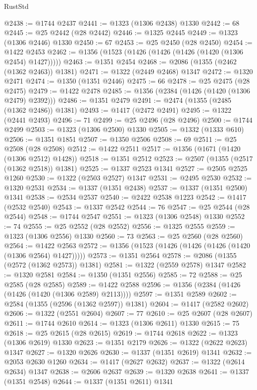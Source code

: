 \begin{lexlean}{RustStd}
\begin{coremodule}
{\begin{coremodule}
{{{{{{{{{{{{{{{{{{{{{{{{{{{{{{{{{{@2438 := @1744 @2437
@2441 := @1323 (@1306 @2438) @1330
@2442 := 68
@2445 := @25 @2442 (@28 @2442)
@2446 := @1325 @2445
@2449 := @1323 (@1306 @2446) @1330
@2450 := 67
@2453 := @25 @2450 (@28 @2450)
@2454 := @1422 @2453
@2462 := @1356 (@1523 (@1426 (@1426 (@1426 (@1420 (@1306 @2454) @1427)))))
@2463 := @1351 @2454
@2468 := @2086 (@1355 (@2462 (@1362 @2463)) @1381)
@2471 := @1322 (@2449 @2468) @1347
@2472 := @1320 @2471
@2474 := @1350 (@1351 @2446)
@2475 := 66
@2478 := @25 @2475 (@28 @2475)
@2479 := @1422 @2478
@2485 := @1356 (@2384 (@1426 (@1420 (@1306 @2479) @2392)))
@2486 := @1351 @2479
@2491 := @2474 (@1355 (@2485 (@1362 @2486)) @1381)
@2493 := @1417 (@2472 @2491)
@2495 := @1322 (@2441 @2493)
@2496 := 71
@2499 := @25 @2496 (@28 @2496)
@2500 := @1744 @2499
@2503 := @1323 (@1306 @2500) @1330
@2505 := @1332 (@1333 @610)
@2506 := @1351 @1851
@2507 := @1350 @2506
@2508 := 69
@2511 := @25 @2508 (@28 @2508)
@2512 := @1422 @2511
@2517 := @1356 (@1671 (@1420 (@1306 @2512) @1428))
@2518 := @1351 @2512
@2523 := @2507 (@1355 (@2517 (@1362 @2518)) @1381)
@2525 := @1337 @2523 @1341
@2527 := @2505 @2525 @1260
@2530 := @1322 (@2503 @2527) @1347
@2531 := @2495 @2530
@2532 := @1320 @2531
@2534 := @1337 (@1351 @2438)
@2537 := @1337 (@1351 @2500) @1341
@2538 := @2534 @2537
@2540 := @2422 @2538 @1223
@2542 := @1417 (@2532 @2540)
@2543 := @1337 @2542
@2544 := 76
@2547 := @25 @2544 (@28 @2544)
@2548 := @1744 @2547
@2551 := @1323 (@1306 @2548) @1330
@2552 := 74
@2555 := @25 @2552 (@28 @2552)
@2556 := @1325 @2555
@2559 := @1323 (@1306 @2556) @1330
@2560 := 73
@2563 := @25 @2560 (@28 @2560)
@2564 := @1422 @2563
@2572 := @1356 (@1523 (@1426 (@1426 (@1426 (@1420 (@1306 @2564) @1427)))))
@2573 := @1351 @2564
@2578 := @2086 (@1355 (@2572 (@1362 @2573)) @1381)
@2581 := @1322 (@2559 @2578) @1347
@2582 := @1320 @2581
@2584 := @1350 (@1351 @2556)
@2585 := 72
@2588 := @25 @2585 (@28 @2585)
@2589 := @1422 @2588
@2596 := @1356 (@2384 (@1426 (@1426 (@1420 (@1306 @2589) @2113))))
@2597 := @1351 @2589
@2602 := @2584 (@1355 (@2596 (@1362 @2597)) @1381)
@2604 := @1417 (@2582 @2602)
@2606 := @1322 (@2551 @2604)
@2607 := 77
@2610 := @25 @2607 (@28 @2607)
@2611 := @1744 @2610
@2614 := @1323 (@1306 @2611) @1330
@2615 := 75
@2618 := @25 @2615 (@28 @2615)
@2619 := @1744 @2618
@2622 := @1323 (@1306 @2619) @1330
@2623 := @1351 @2179
@2626 := @1322 (@2622 @2623) @1347
@2627 := @1320 @2626
@2630 := @1337 (@1351 @2619) @1341
@2632 := @2053 @2630 @1260
@2634 := @1417 (@2627 @2632)
@2637 := @1322 (@2614 @2634) @1347
@2638 := @2606 @2637
@2639 := @1320 @2638
@2641 := @1337 (@1351 @2548)
@2644 := @1337 (@1351 @2611) @1341
}}}}}}}}}}}}}}}}}}}}}}}}}}}}}}}}}}
\end{coremodule}}
\end{coremodule}
\end{lexlean}
